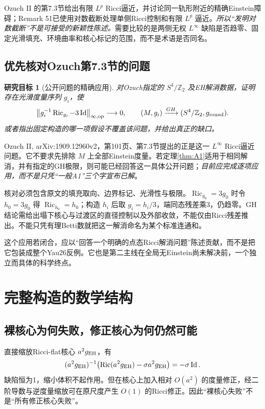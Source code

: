\documentclass[UTF8,a4paper,11pt,fontset=fandol]{ctexart}
\numberwithin{equation}{section}
\newtheorem{target}[theorem]{研究目标}
\theoremstyle{definition}
\newcommand{\Ric}{\operatorname{Ric}}
\newcommand{\Id}{\operatorname{Id}}
\newcommand{\op}{\mathrm{op}}
\newcommand{\Z}{\mathbb Z}
\newcommand{\norm}[1]{\left\lVert#1\right\rVert}
\begin{document}
Ozuch II 的第7.3节给出有限 $L^p$ Ricci逼近，并讨论同一轨形附近的精确Einstein障碍；Remark 51已使用对数截断处理单侧Ricci控制和有限 $L^p$ 逼近。\emph{所以“发明对数截断”不是可接受的新颖性陈述。}需要比较的是两侧无权 $L^\infty$ 缺陷是否趋零、固定光滑填充、环境曲率和核心标记的范围，而不是术语是否同名\cite{OzuchII}。

\subsection{优先核对Ozuch第7.3节的问题}
\begin{target}[公开问题的精确应用]\label{tar:football}
对Ozuch指定的 $S^4/\Z_2$ 及EH解消数据，证明存在光滑度量序列 $g_i$，使
\begin{equation}\label{eq:football}
\norm{g_i^{-1}\Ric_{g_i}-3\Id}_{\infty,\op}\longrightarrow0,
\qquad (M,g_i)\xrightarrow{GH}(S^4/\Z_2,g_{\rm round}).
\end{equation}
或者指出固定构造的哪一项假设不覆盖该问题，并给出真正的缺口。
\end{target}
Ozuch II, arXiv:1909.12960v2，第101页、第7.3节提出的正是这一 $L^\infty$ Ricci逼近问题\cite{OzuchII}。它不要求先排除 $M$ 上全部Einstein度量。若定理\ref{thm:A1}适用于相同解消，并有指定的GH极限，则可能已经回答这一具体公开问题；\emph{目前应完成逐项应用，而不是只凭“一般A1”三个字宣布已解}。

核对必须包含原文的填充取向、边界标记、光滑性与极限。$\Ric_{g_0}=3g_0$ 时令 $h_0=3g_0$ 得 $\Ric_{h_0}=h_0$；构造 $h_i$ 后取 $g_i=h_i/3$，端同态残差乘3，仍趋零。GH结论需给出塌下核心与过渡区的直径控制以及外部收敛，不能仅由Ricci残差推出。不能只凭有理Betti数就把这一解消命名为某个标准连通和。

这个应用若闭合，应以“回答一个明确的点态Ricci解消问题”陈述贡献，而不是把它包装成整个Yau26反例。它也是第二主线在全局无Einstein尚未解决前，一个独立而具体的科学终点。

\section{完整构造的数学结构}
\subsection{裸核心为何失败，修正核心为何仍然可能}
直接缩放Ricci-flat核心 $a^2g_{\rm EH}$，有
\[
(a^2g_{\rm EH})^{-1}\bigl(\Ric(a^2g_{\rm EH})-\sigma a^2g_{\rm EH}\bigr)=-\sigma\Id.
\]
缺陷恒为1，缩小体积不起作用。但在核心上加入相对 $O(a^2)$ 的度量修正，经二阶导数与逆度量缩放可在原尺度产生 $O(1)$ 的Ricci修正。因此“裸核心失败”不是“所有修正核心失败”。
\end{document}
